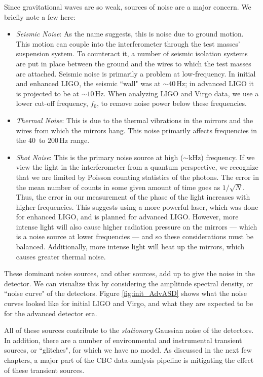 Since gravitational waves are so weak, sources of noise are a major concern. We briefly note a few here:
\begin{itemize}
\item{\emph{Seismic Noise}: As the name suggests, this is noise due to ground motion. This motion can couple into the interferometer through the test masses' suspension system. To counteract it, a number of seismic isolation systems are put in place between the ground and the wires to which the test masses are attached. Seismic noise is primarily a problem at low-frequency. In initial and enhanced \ac{LIGO}, the seismic ``wall" was at $\sim 40\,$Hz; in advanced \ac{LIGO} it is projected to be at $\sim 10\,$Hz. When analyzing \ac{LIGO} and Virgo data, we use a lower cut-off frequency, $f_0$, to remove noise power below these frequencies.}
\item{\emph{Thermal Noise}: This is due to the thermal vibrations in the mirrors and the wires from which the mirrors hang. This noise primarily affects frequencies in the $40\,$ to $200\,$Hz range.}
\item{\emph{Shot Noise}: This is the primary noise source at high ($\sim$kHz) frequency. If we view the light in the interferometer from a quantum perspective, we recognize that we are limited by Poisson counting statistics of the photons. The error in the mean number of counts in some given amount of time goes as $1/\sqrt{N}$. Thus, the error in our measurement of the phase of the light increases with higher frequencies. This suggests using a more powerful laser, which was done for enhanced \ac{LIGO}, and is planned for advanced \ac{LIGO}. However, more intense light will also cause higher radiation pressure on the mirrors --- which is a noise source at lower frequencies --- and so these considerations must be balanced. Additionally, more intense light will heat up the mirrors, which causes greater thermal noise.}
\end{itemize}
These dominant noise sources, and other sources, add up to give the noise in the detector. We can visualize this by considering the amplitude spectral density, or ``noise curve" of the detectors. Figure \ref{fig:init_AdvASD} shows what the noise curves looked like for initial \ac{LIGO} and Virgo, and what they are expected to be for the advanced detector era.

All of these sources contribute to the \emph{stationary} Gaussian noise of the detectors. In addition, there are a number of environmental and instrumental transient sources, or ``glitches", for which we have no model. As discussed in the next few chapters, a major part of the \ac{CBC} data-analysis pipeline is mitigating the effect of these transient sources.

